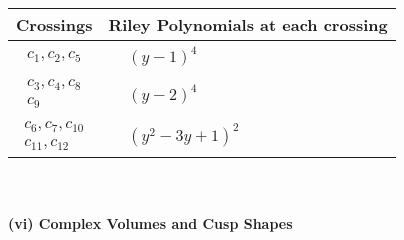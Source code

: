 \documentclass[1p]{elsarticle_modified}
\theoremstyle{definition}
\begin{document}
\begin{tabular}{m{50pt}|m{274pt}}
Crossings & \hspace{64pt}Riley Polynomials at each crossing \\
\hline $$\begin{aligned}c_{1},c_{2},c_{5}\end{aligned}$$&$\begin{aligned}
&(y-1)^4
\end{aligned}$\\
\hline $$\begin{aligned}c_{3},c_{4},c_{8}\\c_{9}\end{aligned}$$&$\begin{aligned}
&(y-2)^4
\end{aligned}$\\
\hline $$\begin{aligned}c_{6},c_{7},c_{10}\\c_{11},c_{12}\end{aligned}$$&$\begin{aligned}
&(y^2-3 y+1)^2
\end{aligned}$\\
\hline
\end{tabular}\\~\\
\newpage\flushleft \textbf{(vi) Complex Volumes and Cusp Shapes}
\end{document}

